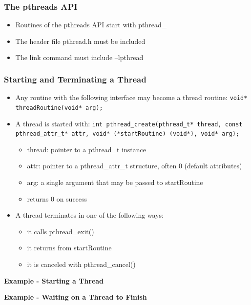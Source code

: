 \subsubsection{The pthreads API}
\begin{itemize}
\item Routines of the pthreads API start with pthread\_
\item The header file pthread.h must be included
\item The link command must include –lpthread
\end{itemize}
\subsubsection{Starting and Terminating a Thread}
\begin{itemize}
\item Any routine with the following interface may become a thread routine:\newline
\lstinline{void* threadRoutine(void* arg);}
\item A thread is started with:\newline
\lstinline{int pthread_create(pthread_t* thread, const pthread_attr_t* attr, void* (*startRoutine) (void*), void* arg);}
  \begin{itemize}
  \item thread: pointer to a pthread\_t instance
  \item attr: pointer to a pthread\_attr\_t structure, often 0 (default attributes)
  \item arg: a single argument that may be passed to startRoutine
  \item returns 0 on success 
  \end{itemize}
\item A thread terminates in one of the following ways:
  \begin{itemize}
  \item it calls pthread\_exit()
  \item it returns from startRoutine
  \item it is canceled with pthread\_cancel()
  \end{itemize}
\end{itemize}
\textbf{Example - Starting a Thread}

\textbf{Example - Waiting on a Thread to Finish}

